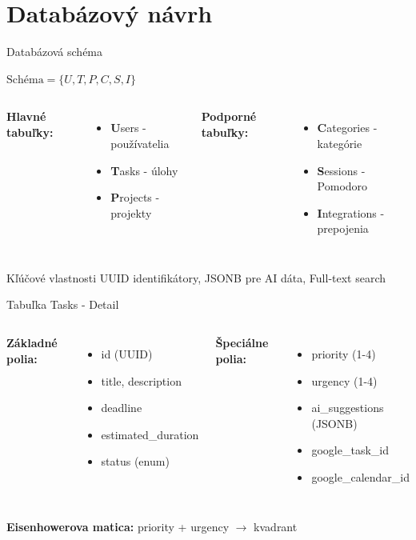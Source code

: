 \documentclass{beamer}
\begin{document}
\section{Databázový návrh}

\begin{frame}{Databázová schéma}
\begin{center}
$\text{Schéma} = \{ U, T, P, C, S, I \}$
\end{center}

\begin{columns}
\textbf{Hlavné tabuľky:}
\begin{itemize}
\item \textbf{U}sers - používatelia
\item \textbf{T}asks - úlohy
\item \textbf{P}rojects - projekty
\end{itemize}

\textbf{Podporné tabuľky:}
\begin{itemize}
\item \textbf{C}ategories - kategórie
\item \textbf{S}essions - Pomodoro
\item \textbf{I}ntegrations - prepojenia
\end{itemize}
\end{columns}

\vspace{0.5cm}
\begin{block}{Kľúčové vlastnosti}
UUID identifikátory, JSONB pre AI dáta, Full-text search
\end{block}
\end{frame}

\begin{frame}{Tabuľka Tasks - Detail}
\begin{columns}
\textbf{Základné polia:}
\begin{itemize}
\item id (UUID)
\item title, description
\item deadline
\item estimated\_duration
\item status (enum)
\end{itemize}

\textbf{Špeciálne polia:}
\begin{itemize}
\item priority (1-4)
\item urgency (1-4)
\item ai\_suggestions (JSONB)
\item google\_task\_id
\item google\_calendar\_id
\end{itemize}
\end{columns}

\vspace{0.3cm}
\textbf{Eisenhowerova matica:} priority + urgency $\rightarrow$ kvadrant
\end{frame}
\end{document}
